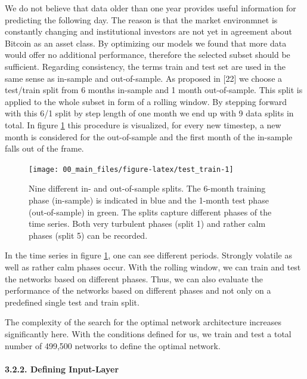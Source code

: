 \documentclass[
]{article}
\begin{document}
We do not believe that data older than one year provides useful
information for predicting the following day. The reason is that the
market environmnet is constantly changing and institutional investors
are not yet in agreement about Bitcoin as an asset class. By optimizing
our models we found that more data would offer no additional
performance, therefore the selected subset should be sufficient.
Regarding consistency, the terms train and test set are used in the same
sense as in-sample and out-of-sample. As proposed in {[}22{]} we choose
a test/train split from 6 months in-sample and 1 month out-of-sample.
This split is applied to the whole subset in form of a rolling window.
By stepping forward with this 6/1 split by step length of one month we
end up with 9 data splits in total. In figure \ref{fig:test_train} this
procedure is visualized, for every new timestep, a new month is
considered for the out-of-sample and the first month of the in-sample
falls out of the frame.

\begin{figure}

{\centering \texttt{[image: 00\_main\_files/figure-latex/test\_train-1]} 

}

\caption{Nine different in- and out-of-sample splits. The 6-month training phase (in-sample) is indicated in blue and the 1-month test phase (out-of-sample) in green. The splits capture different phases of the time series. Both very turbulent phases (split 1) and rather calm phases (split 5) can be recorded.}\label{fig:test_train}
\end{figure}

In the time series in figure \ref{fig:test_train}, one can see different
periods. Strongly volatile as well as rather calm phases occur. With the
rolling window, we can train and test the networks based on different
phases. Thus, we can also evaluate the performance of the networks based
on different phases and not only on a predefined single test and train
split.

The complexity of the search for the optimal network architecture
increases significantly here. With the conditions defined for us, we
train and test a total number of 499,500 networks to define the optimal
network.

\newpage

\hypertarget{input-layer}{%
\paragraph{3.2.2. Defining Input-Layer}\label{input-layer}}
\end{document}
